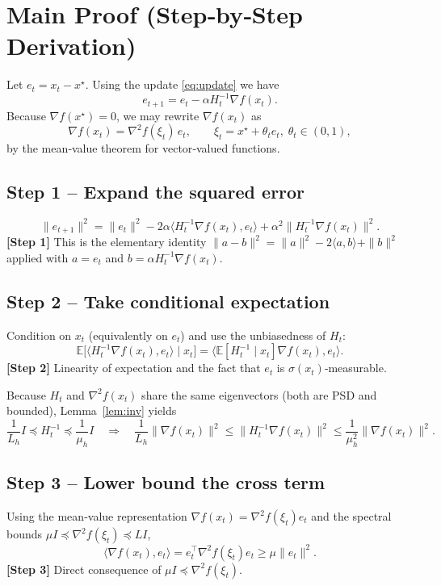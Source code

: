 \documentclass{article}
\newcommand{\E}{\mathbb{E}}
\begin{document}
\section*{Main Proof (Step‑by‑Step Derivation)}
Let $e_{t}=x_{t}-x^{\star}$. Using the update \eqref{eq:update} we have
\[
e_{t+1}=e_{t}-\alpha H_{t}^{-1}\nabla f(x_{t}) .
\tag{1}
\]
Because $\nabla f(x^{\star})=0$, we may rewrite $\nabla f(x_{t})$ as
\[
\nabla f(x_{t})=\nabla^{2}f(\xi_{t})\,e_{t},
\qquad \xi_{t}=x^{\star}+\theta_{t}e_{t},\; \theta_{t}\in(0,1),
\]
by the mean‑value theorem for vector‑valued functions.

\subsection*{Step 1 – Expand the squared error}
\[
\|e_{t+1}\|^{2}
= \|e_{t}\|^{2}
-2\alpha\langle H_{t}^{-1}\nabla f(x_{t}),e_{t}\rangle
+\alpha^{2}\|H_{t}^{-1}\nabla f(x_{t})\|^{2}.
\tag{2}\label{eq:expansion}
\]
\textbf{[Step 1]} This is the elementary identity $\|a-b\|^{2}= \|a\|^{2}-2\langle a,b\rangle+\|b\|^{2}$ applied with $a=e_{t}$ and $b=\alpha H_{t}^{-1}\nabla f(x_{t})$.

\subsection*{Step 2 – Take conditional expectation}
Condition on $x_{t}$ (equivalently on $e_{t}$) and use the unbiasedness of $H_{t}$:
\[
\E\bigl[\langle H_{t}^{-1}\nabla f(x_{t}),e_{t}\rangle\mid x_{t}\bigr]
= \bigl\langle \E[H_{t}^{-1}\mid x_{t}]\nabla f(x_{t}),e_{t}\bigr\rangle .
\tag{3}
\]
\textbf{[Step 2]} Linearity of expectation and the fact that $e_{t}$ is $\sigma(x_{t})$‑measurable.

Because $H_{t}$ and $\nabla^{2}f(x_{t})$ share the same eigenvectors (both are PSD and bounded), Lemma~\ref{lem:inv} yields
\[
\frac{1}{L_{h}} I\preceq H_{t}^{-1}\preceq \frac{1}{\mu_{h}} I
\quad\Longrightarrow\quad
\frac{1}{L_{h}}\|\nabla f(x_{t})\|^{2}
\le \|H_{t}^{-1}\nabla f(x_{t})\|^{2}
\le \frac{1}{\mu_{h}^{2}}\|\nabla f(x_{t})\|^{2}.
\tag{4}\label{eq:invbound}
\]

\subsection*{Step 3 – Lower bound the cross term}
Using the mean‑value representation $\nabla f(x_{t})=\nabla^{2}f(\xi_{t})e_{t}$ and the spectral bounds $\mu I\preceq\nabla^{2}f(\xi_{t})\preceq L I$,
\[
\langle \nabla f(x_{t}),e_{t}\rangle
= e_{t}^{\!\top}\nabla^{2}f(\xi_{t})e_{t}
\ge \mu\|e_{t}\|^{2}.
\tag{5}
\]
\textbf{[Step 3]} Direct consequence of $\mu I\preceq\nabla^{2}f(\xi_{t})$.
\end{document}
